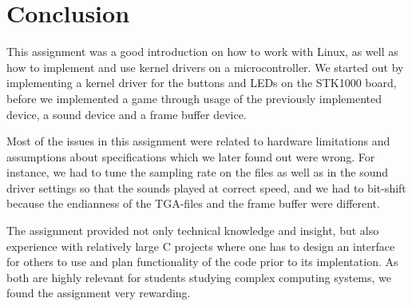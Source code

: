 \section{Conclusion}

This assignment was a good introduction on how to work with Linux, as
well as how to implement and use kernel drivers on a microcontroller. We
started out by implementing a kernel driver for the buttons and LEDs on
the STK1000 board, before we implemented a game through usage of the
previously implemented device, a sound device and a frame buffer
device.

Most of the issues in this assignment were related to hardware
limitations and assumptions about specifications which we later found
out were wrong. For instance, we had to tune the sampling rate on the
files as well as in the sound driver settings so that the sounds played at correct speed, and we had to
bit-shift because the endianness of the TGA-files and the frame buffer
were different.

The assignment provided not only technical knowledge and insight, but
also experience with relatively large C projects where one has to
design an interface for others to use and plan functionality of the code
prior to its implentation. As both are highly relevant for students
studying complex computing systems, we found the assignment very
rewarding.
